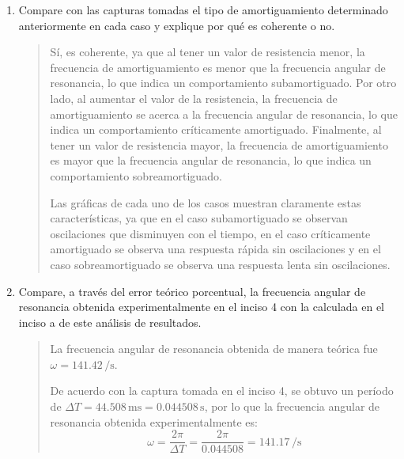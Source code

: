 \documentclass{article}
\begin{document}
\begin{enumerate}[label=\alph*.-]
\begin{quote}
            Resistencia $R_1 = 0.5\,\unit{\ohm}$:
            \[
                \alpha = 2000\,\si{\per\second}
            \]

            Este último caso es el sobreamortiguado, ya que $\alpha > \omega$.
            
        \end{quote}

        \item Compare con las capturas tomadas el tipo de amortiguamiento determinado anteriormente en cada caso y explique por qué es coherente o no.
        
        \begin{quote}
            Sí, es coherente, ya que al tener un valor de resistencia menor, la frecuencia de amortiguamiento es menor que la frecuencia angular de resonancia, lo que indica un comportamiento subamortiguado. Por otro lado, al aumentar el valor de la resistencia, la frecuencia de amortiguamiento se acerca a la frecuencia angular de resonancia, lo que indica un comportamiento críticamente amortiguado. Finalmente, al tener un valor de resistencia mayor, la frecuencia de amortiguamiento es mayor que la frecuencia angular de resonancia, lo que indica un comportamiento sobreamortiguado.

            Las gráficas de cada uno de los casos muestran claramente estas características, ya que en el caso subamortiguado se observan oscilaciones que disminuyen con el tiempo, en el caso críticamente amortiguado se observa una respuesta rápida sin oscilaciones y en el caso sobreamortiguado se observa una respuesta lenta sin oscilaciones.
        \end{quote}

        \item Compare, a través del error teórico porcentual, la frecuencia angular de resonancia obtenida experimentalmente en el inciso 4 con la calculada en el inciso a de este análisis de resultados.
        
        \begin{quote}
            La frecuencia angular de resonancia obtenida de manera teórica fue $\omega = 141.42\,\si{\per\second}$.

            De acuerdo con la captura tomada en el inciso 4, se obtuvo un período de $\Delta T = 44.508\,\unit{\milli\second} = 0.044508\,\unit{\second}$, por lo que la frecuencia angular de resonancia obtenida experimentalmente es:
            \[
                \omega = \frac{2\pi}{\Delta T} = \frac{2\pi}{0.044508} = 141.17\,\unit{\per\second}
            \]


\end{quote}
\end{enumerate}
\end{document}
